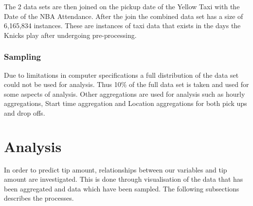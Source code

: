 \documentclass[11pt]{article}
\begin{document}
The 2 data sets are then joined on the pickup date of the Yellow Taxi with the Date of the NBA Attendance. After the join the combined data set has a size of 6,165,834 instances. These are instances of taxi data that exists in the days the Knicks play after undergoing pre-processing.

\subsubsection{Sampling}
Due to limitations in computer specifications a full distribution of the data set could not be used for analysis. Thus 10\% of the full data set is taken and used for some aspects of analysis. Other aggregations are used for analysis such as hourly aggregations, Start time aggregation and Location aggregations for both pick ups and drop offs.

\section{Analysis}
In order to predict tip amount, relationships between our variables and tip amount are investigated. This is done through visualisation of the data that has been aggregated and data which have been sampled. The following subsections describes the processes. 
\end{document}
